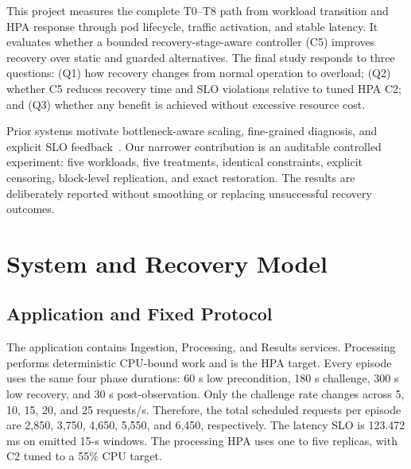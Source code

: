 \documentclass[10pt,twocolumn]{article}
\begin{document}
This project measures the complete T0--T8 path from workload transition and HPA response through pod lifecycle, traffic activation, and stable latency. It evaluates whether a bounded recovery-stage-aware controller (C5) improves recovery over static and guarded alternatives. The final study responds to three questions: (Q1) how recovery changes from normal operation to overload; (Q2) whether C5 reduces recovery time and SLO violations relative to tuned HPA C2; and (Q3) whether any benefit is achieved without excessive resource cost.

Prior systems motivate bottleneck-aware scaling, fine-grained diagnosis, and explicit SLO feedback~\cite{pbscaler,firm,autothrottle}. Our narrower contribution is an auditable controlled experiment: five workloads, five treatments, identical constraints, explicit censoring, block-level replication, and exact restoration. The results are deliberately reported without smoothing or replacing unsuccessful recovery outcomes.

\begin{table}[t]
\centering
\caption{Position Relative to Representative Prior Work}
\label{tab:related}
\end{table}

\section{System and Recovery Model}
\subsection{Application and Fixed Protocol}
The application contains Ingestion, Processing, and Results services. Processing performs deterministic CPU-bound work and is the HPA target. Every episode uses the same four phase durations: 60 s low precondition, 180 s challenge, 300 s low recovery, and 30 s post-observation. Only the challenge rate changes across 5, 10, 15, 20, and 25 requests/s. Therefore, the total scheduled requests per episode are 2,850, 3,750, 4,650, 5,550, and 6,450, respectively. The latency SLO is 123.472 ms on emitted 15-s windows. The processing HPA uses one to five replicas, with C2 tuned to a 55\% CPU target.
\end{document}

